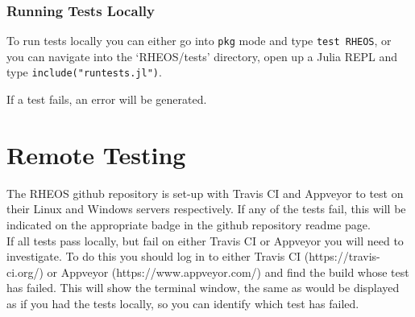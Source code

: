 \documentclass[]{article}
\newcommand{\cod}[1]{\colorbox{light-light-gray}{\texttt{#1}}}
\begin{document}
\subsubsection{Running Tests Locally}
To run tests locally you can either go into \cod{pkg} mode and type \cod{test RHEOS}, or you can navigate into the `RHEOS/tests' directory, open up a Julia REPL and type \cod{include("runtests.jl")}.

If a test fails, an error will be generated. 

\section{Remote Testing}
The RHEOS github repository is set-up with Travis CI and Appveyor to test on their Linux and Windows servers respectively. If any of the tests fail, this will be indicated on the appropriate badge in the github repository readme page.\\

If all tests pass locally, but fail on either Travis CI or Appveyor you will need to investigate. To do this you should log in to either Travis CI (https://travis-ci.org/) or Appveyor (https://www.appveyor.com/) and find the build whose test has failed. This will show the terminal window, the same as would be displayed as if you had the tests locally, so you can identify which test has failed.
\end{document}
